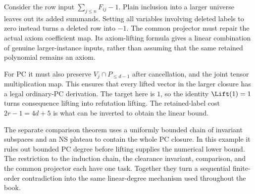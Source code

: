 Consider the row input $\sum_{j\le n}F_{ij}-1$. Plain inclusion into
a larger universe leaves out its added summands. Setting all variables
involving deleted labels to zero instead turns a deleted row into
$-1$. The common projector must repair the actual axiom coefficient
map. Its axiom-lifting formula gives a linear combination of genuine
larger-instance inputs, rather than assuming that the same retained
polynomial remains an axiom.

For PC it must also preserve $V_j\cap P_{\le d-1}$ after cancellation,
and the joint tensor multiplication map. This ensures that every
lifted vector in the larger closure has a legal ordinary-PC derivation.
The target here is $1$, so the identity $\Lift(1)=1$ turns consequence
lifting into refutation lifting. The retained-label cost $2r-1=4d+5$
is what can be inverted to obtain the linear bound.

The separate comparison theorem uses a uniformly bounded chain of
invariant subspaces and an NS plateau to contain the whole PC closure.
In this example it rules out bounded PC degree before lifting supplies
the numerical lower bound. The restriction to the induction chain,
the clearance invariant, comparison, and the common projector each
have one task. Together they turn a sequential finite-order
contradiction into the same linear-degree mechanism used throughout
the book.
